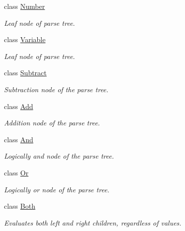 \begin{DoxyCompactItemize}
class \hyperlink{classMadara_1_1Expression__Tree_1_1Number}{Number}
\begin{DoxyCompactList}\small\item\em Leaf node of parse tree. \item\end{DoxyCompactList}\item 
class \hyperlink{classMadara_1_1Expression__Tree_1_1Variable}{Variable}
\begin{DoxyCompactList}\small\item\em Leaf node of parse tree. \item\end{DoxyCompactList}\item 
class \hyperlink{classMadara_1_1Expression__Tree_1_1Subtract}{Subtract}
\begin{DoxyCompactList}\small\item\em Subtraction node of the parse tree. \item\end{DoxyCompactList}\item 
class \hyperlink{classMadara_1_1Expression__Tree_1_1Add}{Add}
\begin{DoxyCompactList}\small\item\em Addition node of the parse tree. \item\end{DoxyCompactList}\item 
class \hyperlink{classMadara_1_1Expression__Tree_1_1And}{And}
\begin{DoxyCompactList}\small\item\em Logically and node of the parse tree. \item\end{DoxyCompactList}\item 
class \hyperlink{classMadara_1_1Expression__Tree_1_1Or}{Or}
\begin{DoxyCompactList}\small\item\em Logically or node of the parse tree. \item\end{DoxyCompactList}\item 
class \hyperlink{classMadara_1_1Expression__Tree_1_1Both}{Both}
\begin{DoxyCompactList}\small\item\em Evaluates both left and right children, regardless of values. \item\end{DoxyCompactList}\item 

\end{DoxyCompactItemize}
